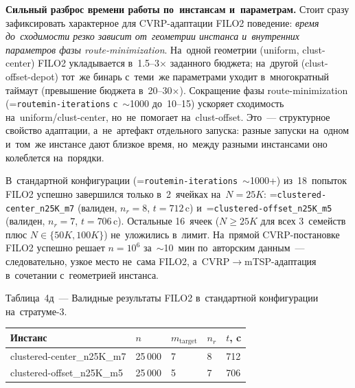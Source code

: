 \documentclass[a4paper,14pt]{extreport}
\makeatletter
\let\old@texttt\texttt
\renewcommand{\texttt}[1]{{\sloppy\hyphenchar\font=\m@ne\old@texttt{#1}}}
\makeatother
\begin{document}
\medskip
\noindent\textbf{Сильный разброс времени работы по~инстансам и~параметрам.} Стоит сразу зафиксировать характерное для CVRP-адаптации FILO2 поведение: \emph{время до~сходимости резко зависит от~геометрии инстанса и~внутренних параметров фазы route-minimization}. На~одной геометрии (uniform, clust-center) FILO2 укладывается в~1.5--3$\times$ заданного бюджета; на~другой (clust-offset-depot) тот~же бинарь с~теми~же параметрами уходит в~многократный таймаут (превышение бюджета в~20--30$\times$). Сокращение фазы route-minimization (\texttt{routemin-iterations} с~$\sim$1000 до~10--15) ускоряет сходимость на~uniform/clust-center, но~не~помогает на~clust-offset. Это~--- структурное свойство адаптации, а~не~артефакт отдельного запуска: разные запуски на~одном и~том~же инстансе дают близкое время, но~между разными инстансами оно колеблется на~порядки.

\medskip
В~стандартной конфигурации (\texttt{routemin-iterations}~$\sim$1000+) из~18~попыток FILO2 успешно завершился только в~2~ячейках на~$N=25K$: \texttt{clustered-center\_n25K\_m7} (валиден, $n_r=8$, $t=712$\,c) и~\texttt{clustered-offset\_n25K\_m5} (валиден, $n_r=7$, $t=706$\,c). Остальные 16~ячеек ($N\geq 25K$ для всех 3~семейств плюс $N\in\{50K,100K\}$) не~уложились в~лимит. На~прямой CVRP-постановке FILO2 успешно решает $n=10^6$ за~$\sim$10~мин по~авторским данным~--- следовательно, узкое место не~сама FILO2, а~CVRP$\to$mTSP-адаптация в~сочетании с~геометрией инстанса.

\medskip
\noindent Таблица~4д~--- Валидные результаты FILO2 в~стандартной конфигурации на~стратуме-3.

\begin{center}\small
\setlength{\tabcolsep}{6pt}
\begin{tabular}{|L{4.4cm}|R{1.2cm}|R{1.0cm}|R{1.2cm}|R{1.0cm}|}
\hline
\textbf{Инстанс} & \textbf{$n$} & \textbf{$m_\mathrm{target}$} & \textbf{$n_r$} & \textbf{$t$, c} \\
\hline
clustered-center\_n25K\_m7   & 25\,000 & 7 & 8 & 712 \\
\hline
clustered-offset\_n25K\_m5   & 25\,000 & 5 & 7 & 706 \\
\hline
\end{tabular}
\end{center}
\end{document}
